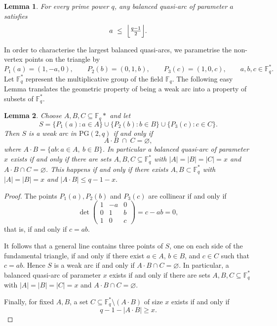 \documentclass{article}
\newtheorem{lemma}{Lemma}
\newcommand{\PG}{\mathrm{PG}}
\newcommand{\F}{\mathbb{F}}
\begin{document}
\begin{lemma}\label{prop:univ}
For every prime power $q$, any balanced quasi-arc of parameter $a$ satisfies
\[
  a\ \le\ \Bigl\lfloor \tfrac{q-1}{2}\Bigr\rfloor .
\]
\end{lemma}

In order to characterise the largest balanced quasi-arcs, we parametrise the non-vertex points on the triangle by
\[
  P_1(a)=(1,-a,0),\qquad P_2(b)=(0,1,b),\qquad P_3(c)=(1,0,c),
  \qquad a,b,c\in \F_q^* .
\]
Let $\F_q^\ast$ represent the multiplicative group of the field $\F_q$.  The following easy Lemma translates the geometric property of being a weak arc into a property of subsets of $\F_q^*$.


\begin{lemma}\label{prop:reduction}
Choose $A,B,C\subseteq \F_q*$ and let
\[
  S=\{P_1(a):a\in A\}\cup\{P_2(b):b\in B\}\cup\{P_3(c):c\in C\}.
\]
Then $S$ is a weak arc in $\PG(2,q)$ if and only if
\[
  A\cdot B\;\cap\;C=\varnothing,
\]
where $A\cdot B=\{ab:a\in A,\ b\in B\}$. In particular a balanced quasi-arc of
parameter $x$ exists if and only if there are sets $A,B,C\subseteq \F_q^\ast$ with
$|A|=|B|=|C|=x$ and $A\cdot B\cap C=\varnothing$. This happens if and only if there exists $A,B\subset \F_q^\ast$ with $|A|=|B|=x$ and $ |A\cdot B|\le q-1-x.$\qedhere
\end{lemma}

\begin{proof}
The points $P_1(a),P_2(b)$ and $P_3(c)$ are collinear if and only if
\[
\det
\begin{pmatrix}
1&-a&0\\
0&1&b\\
1&0&c
\end{pmatrix}
=c-ab=0,
\]
that is, if and only if $c=ab$.

It follows that a general line contains three points of $S$, one on each side of the fundamental triangle, if and only if there exist
$a\in A$, $b\in B$, and $c\in C$ such that $c=ab$. Hence $S$ is a weak arc if and only if
$A\cdot B\cap C=\varnothing$. In particular, a balanced quasi-arc of parameter $x$ exists if and only if there are sets
$A,B,C\subseteq\F_q^\ast$ with
$|A|=|B|=|C|=x$
and $A\cdot B\cap C=\varnothing$.

Finally, for fixed $A,B$, a set $C\subseteq\F_q^\ast\setminus(A\cdot B)$ of size $x$ exists if and only if
\[
q-1-|A\cdot B|\ge x.
\]
\end{proof}
\end{document}
